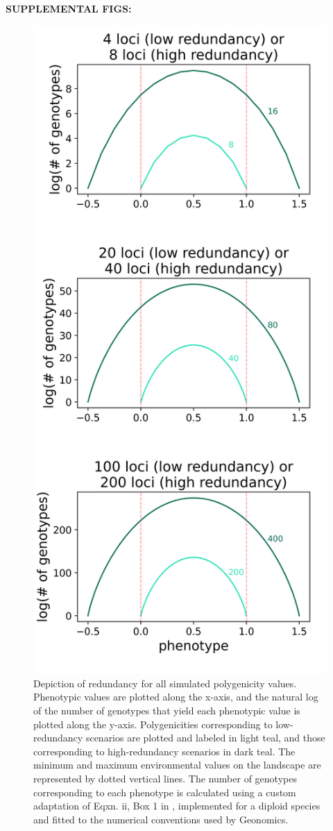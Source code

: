 \documentclass[9pt,twocolumn,twoside,lineno]{pnas-new}
\begin{document}

\textbf{SUPPLEMENTAL FIGS:}


\begin{figure}
\centering
\includegraphics[width=.8\linewidth]{pub/figs/FIG_S1_redundancy.png}
\caption{Depiction of redundancy for all simulated polygenicity values. Phenotypic values are plotted along the x-axis, and the natural log of the number of genotypes that yield each phenotypic value is plotted along the y-axis. Polygenicities corresponding to low-redundancy scenarios are plotted and labeled in light teal, and those corresponding to high-redundancy scenarios in dark teal. The minimum and maximum environmental values on the landscape are represented by dotted vertical lines. The number of genotypes corresponding to each phenotype is calculated using a custom adaptation of Eqxn. ii, Box 1 in \cite{laruson}, implemented for a diploid species and fitted to the numerical conventions used by Geonomics.
}
\label{fig:fig_s1}
\end{figure}
\end{document}
